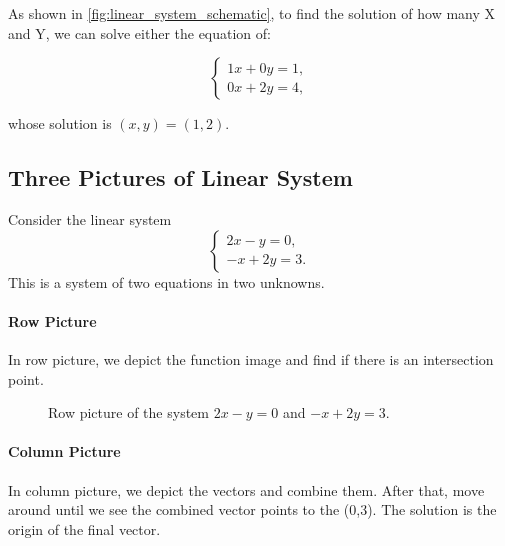 \documentclass[11pt]{article}
\theoremstyle{definition}
\begin{document}
As shown in \autoref{fig:linear_system_schematic}, to find the solution of how many X and Y, we can solve either the equation of:

\[
\begin{cases}
    1x + 0y= 1,\\
    0x + 2y = 4,
\end{cases}
\]

whose solution is \((x,y)=(1,2)\).



\subsection{Three Pictures of Linear System}


Consider the linear system
\[
\begin{cases}
2x-y=0,\\
-x+2y=3.
\end{cases}
\]
This is a system of two equations in two unknowns. 

\paragraph{Row Picture} In row picture, we depict the function image and find if there is an intersection point. 

\begin{figure}[H]
\centering
{}
\caption{Row picture of the system \(2x-y=0\) and \(-x+2y=3\).}
\end{figure}

\paragraph{Column Picture} In column picture, we depict the vectors and combine them. After that, move around until we see the combined vector points to the (0,3). The solution is the origin of the final vector.
\end{document}
